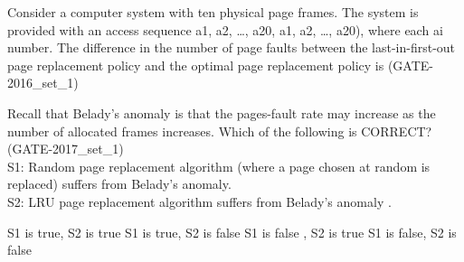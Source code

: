 
\begin{questyle}

  \question  Consider a computer system with ten physical page frames. The system is provided with an access sequence a1, a2, …, a20, a1, a2, …, a20), where each ai number. The difference in the number of page faults between the last-in-first-out page replacement policy and the optimal page replacement policy is \fillin[] (GATE-2016\_set\_1)

\end{questyle}


\begin{questyle}

  \question  Recall that Belady’s anomaly is that the pages-fault rate may increase as the number of allocated
            frames increases. Which of the following is CORRECT? (GATE-2017\_set\_1) \\
            S1: Random page replacement algorithm (where a page chosen at random is replaced) suffers from Belady’s anomaly.\\
            S2: LRU page replacement algorithm suffers from Belady’s anomaly . \\
  \begin{choices}
    \choice S1 is true, S2 is true
    \choice S1 is true, S2 is false
    \choice S1 is false , S2 is true
    \choice S1 is false, S2 is false
  \end{choices}

\end{questyle}












